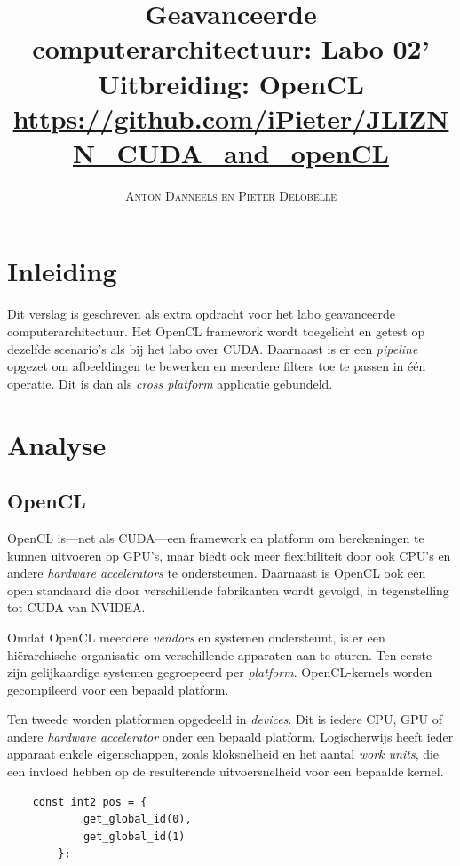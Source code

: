 \documentclass[twocolumn, a4paper]{article}
\begin{document}
\title{Geavanceerde computerarchitectuur: Labo 02' \\ 
\large{Uitbreiding: OpenCL} \\
\small{\url{https://github.com/iPieter/JLIZNN_CUDA_and_openCL}}}
\author{\textsc{Anton Danneels en Pieter Delobelle}}
\date{}
\maketitle

\section{Inleiding}
Dit verslag is geschreven als extra opdracht voor het labo geavanceerde computerarchitectuur. Het OpenCL framework wordt toegelicht en getest op dezelfde scenario's als bij het labo over CUDA. Daarnaast is er een \emph{pipeline} opgezet om afbeeldingen te bewerken en meerdere filters toe te passen in één operatie. Dit is dan als \emph{cross platform} applicatie gebundeld. 

\section{Analyse}

\subsection{OpenCL}
OpenCL is---net als CUDA---een framework en platform om berekeningen te kunnen uitvoeren op GPU's, maar biedt ook meer flexibiliteit door ook CPU's en andere \emph{hardware accelerators} te ondersteunen. Daarnaast is OpenCL ook een open standaard die door verschillende fabrikanten wordt gevolgd, in tegenstelling tot CUDA van NVIDEA.

Omdat OpenCL meerdere \emph{vendors} en systemen ondersteunt, is er een hiërarchische organisatie om verschillende apparaten aan te sturen. Ten eerste zijn gelijkaardige systemen gegroepeerd per \emph{platform}. OpenCL-kernels worden gecompileerd voor een bepaald platform. 

Ten tweede worden platformen opgedeeld in \emph{devices}. Dit is iedere CPU, GPU of andere \emph{hardware accelerator} onder een bepaald platform. Logischerwijs heeft ieder apparaat enkele eigenschappen, zoals kloksnelheid en het aantal \emph{work units}, die een invloed hebben op de resulterende uitvoersnelheid voor een bepaalde kernel.

\begin{verbatim}
    const int2 pos = {
            get_global_id(0), 
            get_global_id(1)
        };
    \end{verbatim}
    \label{c:index}
\end{document}
